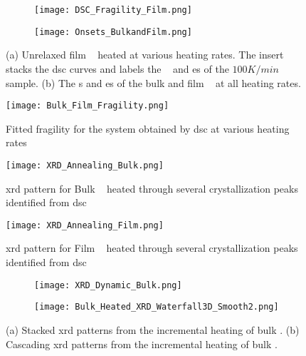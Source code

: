 \documentclass[a4paper,12pt,oneside]{article}%
\begin{document}
\begin{figure}[b]
	\centering
	\begin{subfigure}[htbp]{0.495\textwidth}
		\texttt{[image: DSC\_Fragility\_Film.png]}
		\caption{}
		\label{fig:DSC_vHeatingRate_Film}
	\end{subfigure}
	\begin{subfigure}[htbp]{0.495\textwidth}
		\texttt{[image: Onsets\_BulkandFilm.png]}
		\caption{}
		\label{fig:DSC_Onsets_Film}
	\end{subfigure}
	\caption{(a) Unrelaxed film \MgZnCa~ heated at various heating rates. The insert stacks the \gls{dsc} curves and labels the \Tg~ and \Tx es of the $100 K/min$ sample. (b) The \Tg s and \Tx es of the bulk and film \MgZnCa~ at all heating rates. }%
	\label{fig:DSC_Film}
\end{figure}

\begin{figure}[b]
	\centering
	\texttt{[image: Bulk\_Film\_Fragility.png]}
	\caption[Table of contents Capition]{Fitted fragility for the \MgZnCa system obtained by \acrshort{dsc} at various heating rates}
	\label{fig:Fragility_BulkFilm_mValue}
\end{figure}

\begin{figure}[b]
	\centering
	\texttt{[image: XRD\_Annealing\_Bulk.png]}
	\caption[Table of contents Capition]{\acrshort{xrd} pattern for Bulk \MgZnCa~ heated through several crystallization peaks identified from \acrshort{dsc}}
	\label{fig:XRD_Annealing_Bulk}
\end{figure}

\begin{figure}[b]
	\centering
	\texttt{[image: XRD\_Annealing\_Film.png]}
	\caption[Table of contents Capition]{\acrshort{xrd} pattern for Film \MgZnCa~ heated through several crystallization peaks identified from \acrshort{dsc}}
	\label{fig:XRD_Annealing_Film}
\end{figure}

\begin{figure}[b]
	\centering
	\begin{subfigure}[htbp]{0.75\textwidth}
		\texttt{[image: XRD\_Dynamic\_Bulk.png]}
		\caption{}
		\label{fig:XRD_Dynamic_FullStack_Bulk}
	\end{subfigure}
	\begin{subfigure}[htbp]{0.75\textwidth}
		\texttt{[image: Bulk\_Heated\_XRD\_Waterfall3D\_Smooth2.png]}
		\caption{}
		\label{fig:XRD_Dynamic_WaterFall_Bulk}
	\end{subfigure}
	\caption{(a) Stacked \gls{xrd} patterns from the incremental heating of bulk \MgZnCa. (b) Cascading \gls{xrd} patterns from the incremental heating of bulk \MgZnCa. }%
	\label{fig:XRD_Dynamic_Bulk}
\end{figure}
\end{document}
